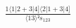 \documentclass[varwidth, border=5pt]{standalone}
\begin{document}
\begin{my}
$\begin{gathered}
\scriptscriptstyle\frac{1⟨1|2+3|4]⟨2|1+3|4]}{⟨13⟩²s_{123}}
\end{gathered}$
\end{my}
\end{document}
